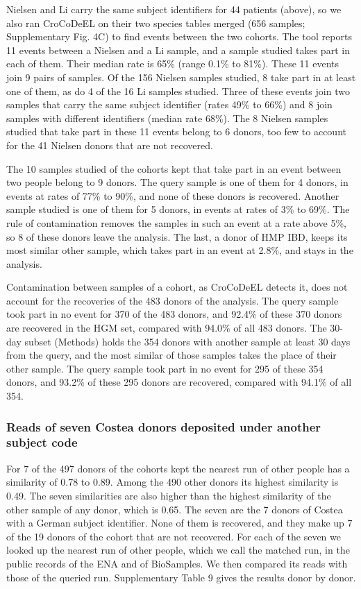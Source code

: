 \documentclass[11pt,a4paper]{article}
\begin{document}
Nielsen and Li carry the same subject identifiers for 44 patients (above), so we also ran CroCoDeEL on their two species tables merged (656 samples; Supplementary Fig. 4C) to find events between the two cohorts. The tool reports 11 events between a Nielsen and a Li sample, and a sample studied takes part in each of them. Their median rate is 65\% (range 0.1\% to 81\%). These 11 events join 9 pairs of samples. Of the 156 Nielsen samples studied, 8 take part in at least one of them, as do 4 of the 16 Li samples studied. Three of these events join two samples that carry the same subject identifier (rates 49\% to 66\%) and 8 join samples with different identifiers (median rate 68\%). The 8 Nielsen samples studied that take part in these 11 events belong to 6 donors, too few to account for the 41 Nielsen donors that are not recovered.

The 10 samples studied of the cohorts kept that take part in an event between two people belong to 9 donors. The query sample is one of them for 4 donors, in events at rates of 77\% to 90\%, and none of these donors is recovered. Another sample studied is one of them for 5 donors, in events at rates of 3\% to 69\%. The rule of contamination removes the samples in such an event at a rate above 5\%, so 8 of these donors leave the analysis. The last, a donor of HMP IBD, keeps its most similar other sample, which takes part in an event at 2.8\%, and stays in the analysis.

Contamination between samples of a cohort, as CroCoDeEL detects it, does not account for the recoveries of the 483 donors of the analysis. The query sample took part in no event for 370 of the 483 donors, and 92.4\% of these 370 donors are recovered in the HGM set, compared with 94.0\% of all 483 donors. The 30-day subset (Methods) holds the 354 donors with another sample at least 30 days from the query, and the most similar of those samples takes the place of their other sample. The query sample took part in no event for 295 of these 354 donors, and 93.2\% of these 295 donors are recovered, compared with 94.1\% of all 354.

\subsubsection*{Reads of seven Costea donors deposited under another subject code}

For 7 of the 497 donors of the cohorts kept the nearest run of other people has a similarity of 0.78 to 0.89. Among the 490 other donors its highest similarity is 0.49. The seven similarities are also higher than the highest similarity of the other sample of any donor, which is 0.65. The seven are the 7 donors of Costea with a German subject identifier. None of them is recovered, and they make up 7 of the 19 donors of the cohort that are not recovered. For each of the seven we looked up the nearest run of other people, which we call the matched run, in the public records of the ENA and of BioSamples. We then compared its reads with those of the queried run. Supplementary Table 9 gives the results donor by donor.
\end{document}
